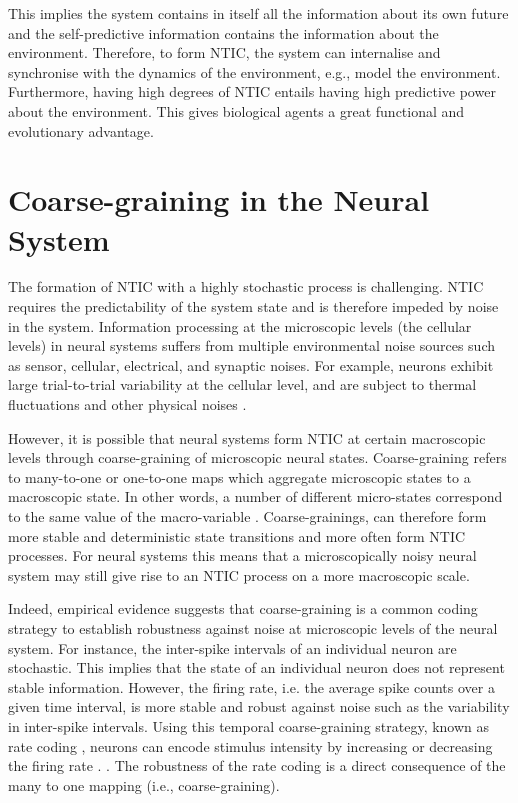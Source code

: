 \documentclass[utf8]{article}
\begin{document}
			\noindent
			This implies the system contains in itself all the information about its own future and the self-predictive information contains the information about the environment. Therefore, to form NTIC, the system can internalise and synchronise with the dynamics of the environment, e.g., model the environment. Furthermore, having high degrees of NTIC entails having high predictive power about the environment. This gives biological agents a great functional and evolutionary advantage. 
			

	\section{Coarse-graining in the Neural System} \label{sec:Neural coarse-graining}

		The formation of NTIC with a  highly stochastic process is challenging. NTIC requires the predictability of the system state and is therefore impeded by noise in the system. Information processing at the microscopic levels (the cellular levels) in neural systems suffers from multiple environmental noise sources such as sensor, cellular, electrical, and synaptic noises. For example, neurons exhibit large trial-to-trial variability at the cellular level, and are subject to thermal fluctuations and other physical noises \citep{faisal2008noise}. 
		
  
		However, it is possible that neural systems form NTIC at certain macroscopic levels through coarse-graining of microscopic neural states. Coarse-graining refers to many-to-one or one-to-one maps which aggregate microscopic states to a macroscopic state. In other words, a number of different micro-states correspond to the same value of the macro-variable \citep{price2007causation}. Coarse-grainings, can therefore form more stable and deterministic state transitions and more often form NTIC processes. For neural systems this means that a microscopically noisy neural system may still give rise to an NTIC process on a more macroscopic scale.
		
		Indeed, empirical evidence suggests that coarse-graining is a common coding strategy to establish robustness against noise at microscopic levels of the neural system. For instance, the inter-spike intervals of an individual neuron are stochastic. This implies that the state of an individual neuron does not represent stable information. However, the firing rate, i.e. the average spike counts over a given time interval, is more stable and robust against noise such as the variability in inter-spike intervals. Using this temporal coarse-graining strategy, known as rate coding \citep{adrian1926impulses, gerstner2002spiking, maass2001pulsed, panzeri2015neural, stein2005neuronal}, neurons can encode stimulus intensity by increasing or decreasing the firing rate \citep{kandel2000principles}. \citep{stein2005neuronal}. The robustness of the rate coding is a direct consequence of the many to one mapping (i.e., coarse-graining).
		
\end{document}
